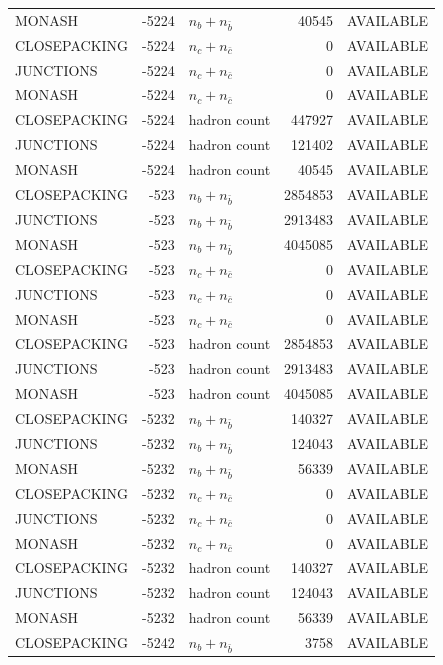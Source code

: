 \begin{landscape}
\begin{longtable}{@{}lrlrl@{}}
MONASH & -5224 & $n_b+n_{\bar b}$ & \num{40545} & AVAILABLE \\
CLOSEPACKING & -5224 & $n_c+n_{\bar c}$ & \num{0} & AVAILABLE \\
JUNCTIONS & -5224 & $n_c+n_{\bar c}$ & \num{0} & AVAILABLE \\
MONASH & -5224 & $n_c+n_{\bar c}$ & \num{0} & AVAILABLE \\
CLOSEPACKING & -5224 & hadron count & \num{447927} & AVAILABLE \\
JUNCTIONS & -5224 & hadron count & \num{121402} & AVAILABLE \\
MONASH & -5224 & hadron count & \num{40545} & AVAILABLE \\
CLOSEPACKING & -523 & $n_b+n_{\bar b}$ & \num{2854853} & AVAILABLE \\
JUNCTIONS & -523 & $n_b+n_{\bar b}$ & \num{2913483} & AVAILABLE \\
MONASH & -523 & $n_b+n_{\bar b}$ & \num{4045085} & AVAILABLE \\
CLOSEPACKING & -523 & $n_c+n_{\bar c}$ & \num{0} & AVAILABLE \\
JUNCTIONS & -523 & $n_c+n_{\bar c}$ & \num{0} & AVAILABLE \\
MONASH & -523 & $n_c+n_{\bar c}$ & \num{0} & AVAILABLE \\
CLOSEPACKING & -523 & hadron count & \num{2854853} & AVAILABLE \\
JUNCTIONS & -523 & hadron count & \num{2913483} & AVAILABLE \\
MONASH & -523 & hadron count & \num{4045085} & AVAILABLE \\
CLOSEPACKING & -5232 & $n_b+n_{\bar b}$ & \num{140327} & AVAILABLE \\
JUNCTIONS & -5232 & $n_b+n_{\bar b}$ & \num{124043} & AVAILABLE \\
MONASH & -5232 & $n_b+n_{\bar b}$ & \num{56339} & AVAILABLE \\
CLOSEPACKING & -5232 & $n_c+n_{\bar c}$ & \num{0} & AVAILABLE \\
JUNCTIONS & -5232 & $n_c+n_{\bar c}$ & \num{0} & AVAILABLE \\
MONASH & -5232 & $n_c+n_{\bar c}$ & \num{0} & AVAILABLE \\
CLOSEPACKING & -5232 & hadron count & \num{140327} & AVAILABLE \\
JUNCTIONS & -5232 & hadron count & \num{124043} & AVAILABLE \\
MONASH & -5232 & hadron count & \num{56339} & AVAILABLE \\
CLOSEPACKING & -5242 & $n_b+n_{\bar b}$ & \num{3758} & AVAILABLE \\

\end{longtable}
\end{landscape}
